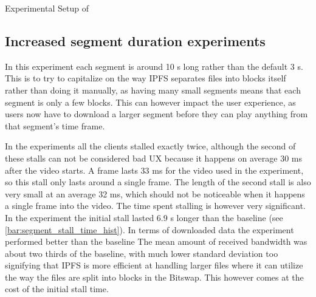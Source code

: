 \begin{table}[!htbp]
    \myfloatalign
    \caption[Experimental Setup of Segment size]{Experimental Setup of }
    \label{tab:exp_overview_video}
    
\end{table}

\subsection{Increased segment duration experiments}
\label{sec:eval_segment}

In this experiment each segment is around 10 \ac{s} long rather than the default 3 \ac{s}. This is to try to capitalize on the way \ac{IPFS} separates files into blocks itself rather than doing it manually, as having many small segments means that each segment is only a few blocks. This can however impact the user experience, as users now have to download a larger segment before they can play anything from that segment's time frame.

In the experiments all the clients stalled exactly twice, although the second of these stalls can not be considered bad \ac{UX} because it happens on average 30 \ac{ms} after the video starts. A frame lasts 33 \ac{ms} for the video used in the experiment, so this stall only lasts around a single frame. The length of the second stall is also very small at an average 32 \ac{ms}, which should not be noticeable when it happens a single frame into the video. The time spent stalling is however very significant. In the experiment the initial stall lasted 6.9 \ac{s} longer than the baseline (see \autoref{bar:segment_stall_time_hist}). In terms of downloaded data the experiment performed better than the baseline The mean amount of received bandwidth was about two thirds of the baseline, with much lower standard deviation too signifying that \ac{IPFS} is more efficient at handling larger files where it can utilize the way the files are split into blocks in the Bitswap. This however comes at the cost of the initial stall time.

\if{}


\fi

